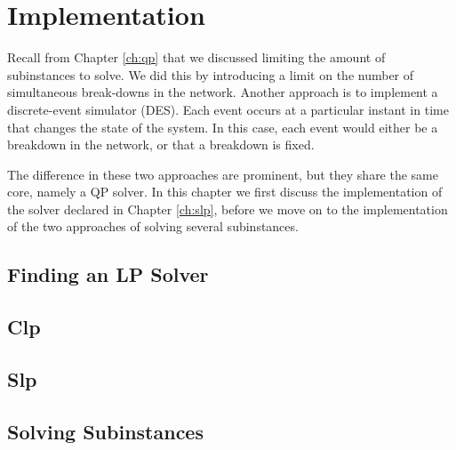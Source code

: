\section{Implementation}
Recall from Chapter \ref{ch:qp} that we discussed limiting the amount
of subinstances to solve. We did this by introducing a limit on the number of
simultaneous break-downs in the network.
Another approach is to implement a discrete-event simulator (DES). Each event
occurs at a particular instant in time that changes the state of the system.
In this case, each event would either be a breakdown in the network, or that
a breakdown is fixed.

The difference in these two approaches are prominent, but they share the same
core, namely a QP solver. In this chapter we first discuss the implementation
of the solver declared in Chapter \ref{ch:slp}, before we move on to the
implementation of the two approaches of solving several subinstances.
\label{ch:implementation}

\subsection{Finding an LP Solver}


\subsection{Clp}


\subsection{Slp}


\subsection{Solving Subinstances}

